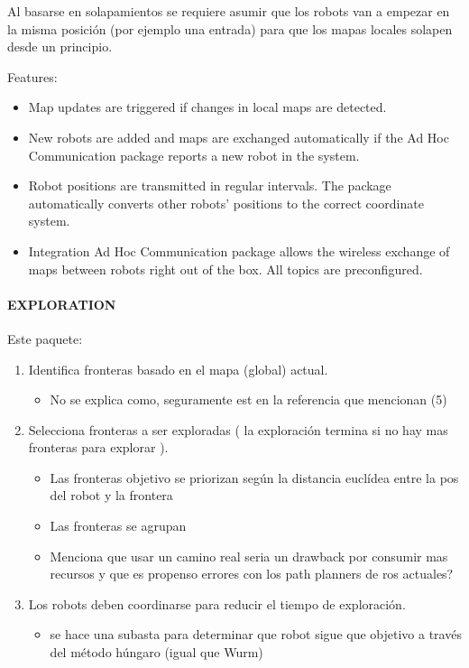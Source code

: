 Al basarse en solapamientos se requiere asumir que los robots van a empezar en la misma posición (por ejemplo una entrada) para que los mapas locales solapen desde un principio.

Features:
\begin{itemize}
\item Map updates are triggered if changes in local maps are detected.
\item New robots are added and maps are exchanged automatically if the Ad Hoc Communication package reports a new robot in the system.
\item Robot positions are transmitted in regular intervals. The package automatically converts other robots’ positions to the correct coordinate system.
\item Integration Ad Hoc Communication package allows the wireless exchange of maps between robots right out of the box. All topics are preconfigured.
\end{itemize}

\paragraph{EXPLORATION}

Este paquete:
\begin{enumerate}
\item Identifica fronteras basado en el mapa (global) actual.
  \begin{itemize}
     \item No se explica como, seguramente est en la referencia que mencionan (5)
  \end{itemize}
\item Selecciona fronteras a ser exploradas ( la exploración termina si no hay mas fronteras para explorar ).
\
  \begin{itemize}
     \item Las fronteras objetivo se priorizan según la distancia euclídea entre la pos del robot y la frontera 
     \item Las fronteras se agrupan
     \item Menciona que usar un camino real seria un drawback por consumir mas recursos y que es propenso errores con los path planners de ros actuales?
  \end{itemize}
\item Los robots deben coordinarse para reducir el tiempo de exploración.
  \begin{itemize}
     \item se hace una subasta para determinar que robot sigue que objetivo a través del método húngaro (igual que Wurm)
  \end{itemize}
\end{enumerate}

